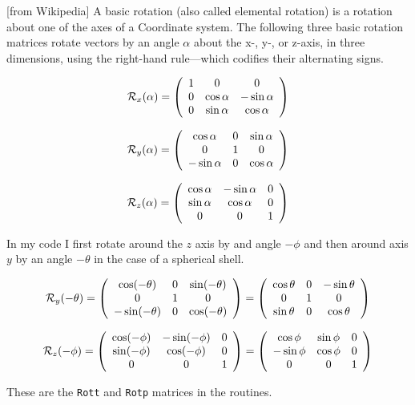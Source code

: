 [from Wikipedia] A basic rotation (also called elemental rotation) is a rotation about one of the axes of a Coordinate system. The following three basic rotation matrices rotate vectors by an angle $\alpha$ 
about the x-, y-, or z-axis, in three dimensions, using the right-hand rule—which codifies their 
alternating signs. 

\[
{\cal R}_x(\alpha)=
\left(
\begin{array}{ccc}
1 & 0 & 0 \\
0 & \cos\alpha & -\sin\alpha \\
0 & \sin\alpha & \cos\alpha
\end{array}
\right)
\]

\[
{\cal R}_y(\alpha)=
\left(
\begin{array}{ccc}
\cos\alpha & 0 & \sin\alpha \\
0 & 1 & 0 \\
-\sin\alpha & 0 &\cos\alpha
\end{array}
\right)
\]

\[
{\cal R}_z(\alpha)=
\left(
\begin{array}{ccc}
\cos\alpha & -\sin\alpha & 0\\
\sin\alpha & \cos\alpha & 0 \\
0 & 0 & 1 
\end{array}
\right)
\]

In my \elefant code
I first rotate around the $z$ axis by and angle $-\phi$ and then 
around axis $y$ by an angle $-\theta$ in the case of a spherical shell.

\[
{\cal R}_y(-\theta)=
\left(
\begin{array}{ccc}
\cos(-\theta) & 0 & \sin(-\theta) \\
0 & 1 & 0 \\
-\sin(-\theta) & 0 &\cos(-\theta)
\end{array}
\right)
=
\left(
\begin{array}{ccc}
\cos\theta & 0 & -\sin\theta \\
0 & 1 & 0 \\
\sin\theta & 0 &\cos\theta
\end{array}
\right)
\]

\[
{\cal R}_z(-\phi)
=
\left(
\begin{array}{ccc}
\cos(-\phi)& -\sin(-\phi) & 0\\
\sin(-\phi)& \cos(-\phi) & 0 \\
0 & 0 & 1 
\end{array}
\right)
=
\left(
\begin{array}{ccc}
\cos\phi& \sin\phi & 0\\
-\sin\phi& \cos\phi & 0 \\
0 & 0 & 1 
\end{array}
\right)
\]

These are the {\tt Rott} and {\tt Rotp} matrices in the routines.



